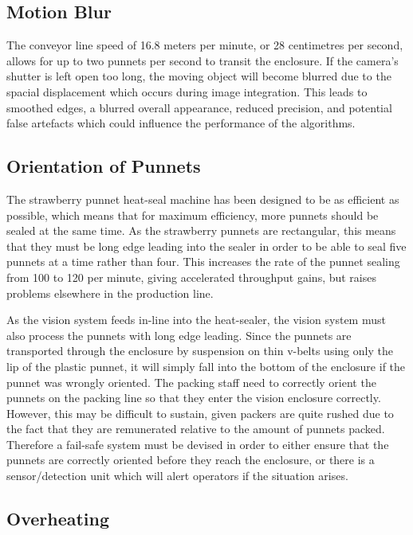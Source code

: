 \documentclass[fleqn,twoside,12pt]{report}
\begin{document}
\subsection{Motion Blur}

The conveyor line speed of 16.8 meters per minute, or 28 centimetres per second, allows for up to two punnets per second to transit the enclosure. If the camera's shutter is left open too long, the moving object will become blurred due to the spacial displacement which occurs during image integration. This leads to smoothed edges, a blurred overall appearance, reduced precision, and potential false artefacts which could influence the performance of the algorithms.



\subsection{Orientation of Punnets}

The strawberry punnet heat-seal machine has been designed to be as efficient as possible, which means that for maximum efficiency, more punnets should be sealed at the same time. As the strawberry punnets are rectangular, this means that they must be long edge leading into the sealer in order to be able to seal five punnets at a time rather than four. This increases the rate of the punnet sealing from 100 to 120 per minute, giving accelerated throughput gains, but raises problems elsewhere in the production line. 

As the vision system feeds in-line into the heat-sealer, the vision system must also process the punnets with long edge leading. Since the punnets are transported through the enclosure by suspension on thin v-belts using only the lip of the plastic punnet, it will simply fall into the bottom of the enclosure if the punnet was wrongly oriented. The packing staff need to correctly orient the punnets on the packing line so that they enter the vision enclosure correctly. However, this may be difficult to sustain, given packers are quite rushed due to the fact that they are remunerated relative to the amount of punnets packed. Therefore a fail-safe system must be devised in order to either ensure that the punnets are correctly oriented before they reach the enclosure, or there is a sensor/detection unit which will alert operators if the situation arises.


\subsection{Overheating}
\end{document}
